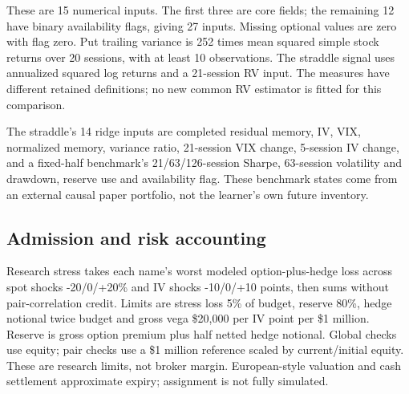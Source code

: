 These are 15 numerical inputs. The first three are core fields; the remaining 12 have binary availability flags, giving 27 inputs. Missing optional values are zero with flag zero. Put trailing variance is 252 times mean squared simple stock returns over 20 sessions, with at least 10 observations. The straddle signal uses annualized squared log returns and a 21-session RV input. The measures have different retained definitions; no new common RV estimator is fitted for this comparison.


The straddle's 14 ridge inputs are completed residual memory, IV, VIX, normalized memory, variance ratio, 21-session VIX change, 5-session IV change, and a fixed-half benchmark's 21/63/126-session Sharpe, 63-session volatility and drawdown, reserve use and availability flag. These benchmark states come from an external causal paper portfolio, not the learner's own future inventory.


\subsection*{Admission and risk accounting}

Research stress takes each name's worst modeled option-plus-hedge loss across spot shocks -20/0/+20\% and IV shocks -10/0/+10 points, then sums without pair-correlation credit. Limits are stress loss 5\% of budget, reserve 80\%, hedge notional twice budget and gross vega \$20,000 per IV point per \$1 million. Reserve is gross option premium plus half netted hedge notional. Global checks use equity; pair checks use a \$1 million reference scaled by current/initial equity. These are research limits, not broker margin. European-style valuation and cash settlement approximate expiry; assignment is not fully simulated.


\FloatBarrier

